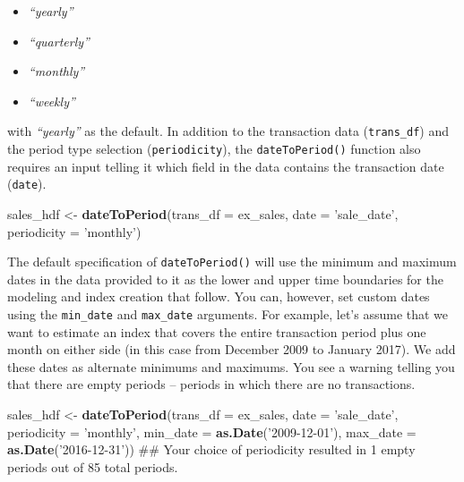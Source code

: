 \documentclass[]{article}
\newenvironment{Shaded}{\begin{snugshade}}{\end{snugshade}}
\newcommand{\KeywordTok}[1]{\textcolor[rgb]{0.13,0.29,0.53}{\textbf{#1}}}
\newcommand{\DataTypeTok}[1]{\textcolor[rgb]{0.13,0.29,0.53}{#1}}
\newcommand{\StringTok}[1]{\textcolor[rgb]{0.31,0.60,0.02}{#1}}
\newcommand{\NormalTok}[1]{#1}
\providecommand{\tightlist}{%
  \setlength{\itemsep}{0pt}\setlength{\parskip}{0pt}}
\begin{document}
\begin{itemize}
\tightlist
\item
  \emph{``yearly''}
\item
  \emph{``quarterly''}
\item
  \emph{``monthly''}
\item
  \emph{``weekly''}
\end{itemize}

with \emph{``yearly''} as the default. In addition to the transaction
data (\texttt{trans\_df}) and the period type selection
(\texttt{periodicity}), the \texttt{dateToPeriod()} function also
requires an input telling it which field in the data contains the
transaction date (\texttt{date}).

\begin{Shaded}
\begin{Highlighting}[]
\NormalTok{  sales_hdf <-}\StringTok{ }\KeywordTok{dateToPeriod}\NormalTok{(}\DataTypeTok{trans_df =}\NormalTok{ ex_sales,}
                            \DataTypeTok{date =} \StringTok{'sale_date'}\NormalTok{,}
                            \DataTypeTok{periodicity =} \StringTok{'monthly'}\NormalTok{)}
\end{Highlighting}
\end{Shaded}

The default specification of \texttt{dateToPeriod()} will use the
minimum and maximum dates in the data provided to it as the lower and
upper time boundaries for the modeling and index creation that follow.
You can, however, set custom dates using the \texttt{min\_date} and
\texttt{max\_date} arguments. For example, let's assume that we want to
estimate an index that covers the entire transaction period plus one
month on either side (in this case from December 2009 to January 2017).
We add these dates as alternate minimums and maximums. You see a warning
telling you that there are empty periods -- periods in which there are
no transactions.

\begin{Shaded}
\begin{Highlighting}[]
\NormalTok{  sales_hdf <-}\StringTok{ }\KeywordTok{dateToPeriod}\NormalTok{(}\DataTypeTok{trans_df =}\NormalTok{ ex_sales,}
                            \DataTypeTok{date =} \StringTok{'sale_date'}\NormalTok{,}
                            \DataTypeTok{periodicity =} \StringTok{'monthly'}\NormalTok{,}
                            \DataTypeTok{min_date =} \KeywordTok{as.Date}\NormalTok{(}\StringTok{'2009-12-01'}\NormalTok{),}
                            \DataTypeTok{max_date =} \KeywordTok{as.Date}\NormalTok{(}\StringTok{'2016-12-31'}\NormalTok{))}
\NormalTok{## Your choice of periodicity resulted in 1 empty periods out of 85 total periods.}
\end{Highlighting}
\end{Shaded}
\end{document}
